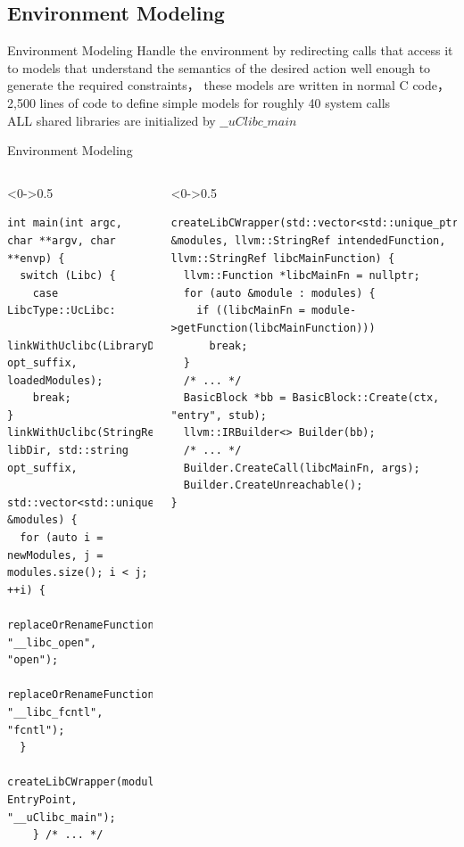 \documentclass[9pt,aspectratio=43,mathserif,table]{beamer}
\begin{document}
\subsection{Environment Modeling}
\begin{frame}{Environment Modeling}
	Handle the environment by redirecting calls that access it to models that understand the 
  semantics of the desired action well enough to generate the required constraints，
  these models are written in normal C code，2,500 lines of code to
	define simple models for roughly 40 system calls
	\\ ALL shared libraries are initialized by $\_\_uClibc\_main$
\end{frame}

\begin{frame}[fragile]{Environment Modeling}
	\begin{columns}[T]
		\begin{column}<0->{0.5\textwidth}
			\begin{lstlisting}[numbersep=4pt]
int main(int argc, char **argv, char **envp) {
  switch (Libc) {
    case LibcType::UcLibc:
    linkWithUclibc(LibraryDir, opt_suffix, loadedModules);
    break;
}
linkWithUclibc(StringRef libDir, std::string opt_suffix,
    std::vector<std::unique_ptr<llvm::Module>> &modules) {
  for (auto i = newModules, j = modules.size(); i < j; ++i) {
    replaceOrRenameFunction(modules[i].get(), "__libc_open", "open");
    replaceOrRenameFunction(modules[i].get(), "__libc_fcntl", "fcntl");
  }
  createLibCWrapper(modules, EntryPoint, "__uClibc_main");
    } /* ... */
      \end{lstlisting}
		\end{column}
		\hfill
		\begin{column}<0->{0.5\textwidth}
			\begin{lstlisting}[firstnumber=last, numbersep=4pt]
createLibCWrapper(std::vector<std::unique_ptr<llvm::Module>> &modules, llvm::StringRef intendedFunction, llvm::StringRef libcMainFunction) {
  llvm::Function *libcMainFn = nullptr;
  for (auto &module : modules) {
    if ((libcMainFn = module->getFunction(libcMainFunction)))
      break;
  }
  /* ... */
  BasicBlock *bb = BasicBlock::Create(ctx, "entry", stub);
  llvm::IRBuilder<> Builder(bb);  
  /* ... */ 
  Builder.CreateCall(libcMainFn, args);
  Builder.CreateUnreachable();
}
      \end{lstlisting}
		\end{column}
	\end{columns}
\end{frame}
\end{document}
